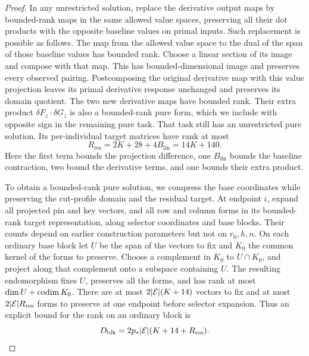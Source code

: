 \begin{proof}
In any unrestricted solution, replace the derivative output
maps by bounded-rank maps in the same allowed value spaces,
preserving all their dot products with the opposite baseline
values on primal inputs.  Such replacement is possible as
follows.  The map from the allowed value space to the dual
of the span of those baseline values has bounded rank.
Choose a linear section of its image and compose with that
map.  This has bounded-dimensional image and preserves every
observed pairing.  Postcomposing the original derivative map
with this value projection leaves its primal derivative
response unchanged and preserves its domain quotient.
The two new derivative maps have bounded rank.  Their extra
product $\delta F_z\cdot\delta G_z$ is also a bounded-rank
pure form, which we include with opposite sign in the
remaining pure task.  That task still has an unrestricted
pure solution.  Its per-individual target matrices have rank at
most
\begin{equation}\label{eq:residual-rank-bound}
 R_{\mathrm{res}}=2K+28+4B_{\mathrm{lin}}=14K+140.
\end{equation}
Here the first term bounds the projection difference, one
$B_{\mathrm{lin}}$ bounds the baseline contraction, two bound
the derivative terms, and one bounds their extra product.

To obtain a bounded-rank pure solution, we compress the base
coordinates while preserving the cut-profile domain and the
residual target.  At endpoint $i$, expand all projected pin and key
vectors, and all row and column forms in its bounded-rank
target representation, along selector coordinates and base
blocks.  Their counts depend on earlier construction
parameters but not on $r_0,h,n$.  On each ordinary base block
let $U$ be the span of the vectors to fix and $K_0$ the common
kernel of the forms to preserve.  Choose a complement in
$K_0$ to $U\cap K_0$, and project along that complement onto
a subspace containing $U$.  The resulting endomorphism fixes
$U$, preserves all the forms, and has rank at most
$\dim U+\operatorname{codim} K_0$.  There are at most
$2|\mathcal E|(K+14)$ vectors to fix and at most
$2|\mathcal E|R_{\mathrm{res}}$ forms to preserve at one endpoint
before selector expansion.  Thus an explicit bound for the
rank on an ordinary block is
\begin{equation}\label{eq:block-compression-bound}
 D_{\mathrm{blk}}
 =2p_*|\mathcal E|(K+14+R_{\mathrm{res}}).
\end{equation}


\end{proof}
